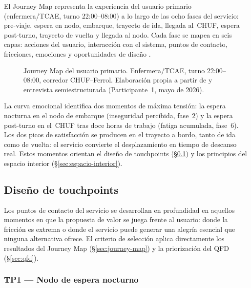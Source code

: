El Journey Map representa la experiencia del usuario
primario (enfermera/\acs{TCAE}, turno 22:00--08:00) a lo
largo de las ocho fases del servicio: pre-viaje, espera
en nodo, embarque, trayecto de ida, llegada al~\acs{CHUF},
espera post-turno, trayecto de vuelta y llegada al nodo.
Cada fase se mapea en seis capas: acciones del usuario,
interacción con el sistema, puntos de contacto, fricciones,
emociones y oportunidades de diseño
\parencite{LouridoRegueira2026}.

\begin{figure}[htbp]
  \centering
  \fbox{\rule{0pt}{10cm}\rule{0.95\textwidth}{0pt}}
  \caption{Journey Map del usuario primario. Enfermera/\acs{TCAE},
    turno 22:00--08:00, corredor \acs{CHUF}--Ferrol.
    Elaboración propia a partir de \parencite{LouridoRegueira2026}
    y entrevista semiestructurada (Participante~1, mayo de 2026).}
  \label{fig:journey-map}
\end{figure}

La curva emocional identifica dos momentos de máxima
tensión: la espera nocturna en el nodo de embarque
(inseguridad percibida, fase~2) y la espera post-turno
en el~\acs{CHUF} tras doce horas de trabajo (fatiga
acumulada, fase~6). Los dos picos de satisfacción se
producen en el trayecto a bordo, tanto de ida como de
vuelta: el servicio convierte el desplazamiento en tiempo
de descanso real. Estos momentos orientan el diseño de
touchpoints (§\ref{sec:touchpoints}) y los principios
del espacio interior (§\ref{sec:espacio-interior}).

\subsection{Diseño de touchpoints}
\label{sec:touchpoints}

Los puntos de contacto del servicio se desarrollan en profundidad
en aquellos momentos en que la propuesta de valor se juega frente
al usuario: donde la fricción es extrema o donde el servicio puede
generar una alegría esencial que ninguna alternativa ofrece. El
criterio de selección aplica directamente los resultados del
Journey Map (§\ref{sec:journey-map}) y la priorización del
\acs{QFD} (§\ref{sec:qfd}).

\subsubsection{TP1 — Nodo de espera nocturno}
\label{sec:tp1}


